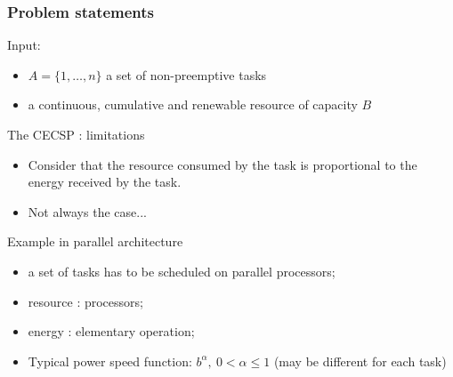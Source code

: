  \begin{frame}
   \frametitle{Problem statements}
   \vfill
   Input:\\
   \begin{itemize}
   \item $A=\{1,\hdots,n\}$ a set of non-preemptive tasks
   \item a continuous, cumulative and renewable resource of capacity  $B$
   \end{itemize}
   \vfill
   \begin{overlayarea}{\linewidth}{1cm}
   \end{overlayarea}
 \end{frame}
 
 
 
 \begin{frame}{The CECSP : limitations}
   \vfill
   \begin{itemize}
   \item Consider that the resource consumed by the task is proportional to
     the energy received by the task.
     \vfill
   \item Not always the case...
   \end{itemize}
   \vfill
   \begin{block}{Example in parallel architecture}
     \begin{itemize}
     \item a set of tasks has to be scheduled on parallel processors;
     \item resource : processors;
     \item energy : elementary operation;
     \item Typical power speed function:  $b^{\alpha} , \ 0 <
       \alpha \le 1$ (may be different for each task)
     \end{itemize}
   \end{block}
   \vfill

 \end{frame}
 
